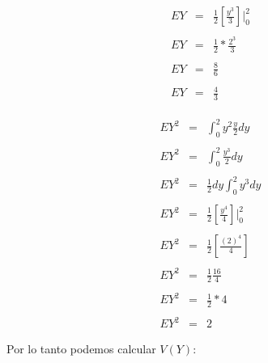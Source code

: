 \documentclass[12pt]{article}
\begin{document}
\begin{center}
\begin{equation*}
\begin{array}{c|c}
\begin{array}{rcl}
                    \\
                    \\
                    EY & = & \displaystyle\frac{1}{2}\left[\frac{y^3}{3}\right]\vert_{0}^{2}
                    \\
                    \\
                    EY & = & \displaystyle\frac{1}{2} * \frac{2^3}{3}
                    \\
                    \\
                    EY & = & \displaystyle\frac{8}{6} 
                    \\
                    \\
                    EY & = & \displaystyle\frac{4}{3}
	            \end{array}
            \end{array}
        \end{equation*}
    \end{center}
         
    \begin{equation*}
		\begin{array}{rcl}
		    EY^2 & = & \displaystyle\int_{0}^{2}y^2\frac{y}{2}dy
		    \\
		    \\
		    EY^2 & = & \displaystyle\int_{0}^{2}\frac{y^3}{2}dy
		    \\
		    \\
		    EY^2 & = & \displaystyle\frac{1}{2}dy\int_{0}^{2}y^3 dy
		    \\
		    \\
		    EY^2 & = & \displaystyle\frac{1}{2}\left[\frac{y^4}{4}\right]\vert_{0}^{2}
		    \\
		    \\
		    EY^2 & = & \displaystyle\frac{1}{2}\left[\frac{(2)^4}{4}\right]
		    \\
		    \\
		    EY^2 & = & \displaystyle\frac{1}{2}\frac{16}{4}
		    \\
		    \\
		    EY^2 & = & \displaystyle\frac{1}{2}* 4
		    \\
		    \\
		    EY^2 & = & 2
		\end{array}
    \end{equation*}

    \begin{flushleft}
        Por lo tanto podemos calcular $V(Y)$:
    \end{flushleft}
        
\end{document}
